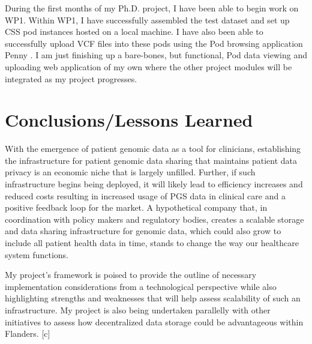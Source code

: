 \documentclass[runningheads]{llncs}
\begin{document}
During the first months of my Ph.D. project, I have been able to begin work on WP1. 
Within WP1, I have successfully assembled the test dataset and set up CSS pod instances hosted on a local machine.
I have also been able to successfully upload VCF files into these pods using the Pod browsing application Penny \cite{penny}. 
I am just finishing up a bare-bones, but functional, Pod data viewing and uploading web application of my own where the other project modules will be integrated as my project progresses.



\section{Conclusions/Lessons Learned}

With the emergence of patient genomic data as a tool for clinicians, establishing the infrastructure for patient genomic data sharing that maintains patient data privacy is an economic niche that is largely unfilled. 
Further, if such infrastructure begins being deployed, it will likely lead to efficiency increases and reduced costs resulting in increased usage of PGS data in clinical care and a positive feedback loop for the market.
A hypothetical company that, in coordination with policy makers and regulatory bodies, creates a scalable storage and data sharing infrastructure for genomic data, which could also grow to include all patient health data in time, stands to change the way our healthcare system functions. 

My project's framework is poised to provide the outline of necessary implementation considerations from a technological perspective while also highlighting strengths and weaknesses that will help assess scalability of such an infrastructure. 
My project is also being undertaken parallelly with other initiatives to assess how decentralized data storage could be advantageous within Flanders. [c]
\end{document}
